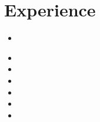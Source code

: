\documentclass[11pt, a4paper]{article}
\begin{document}
\headerSimple

\section*{Experience}
{\scriptsize

  \workplaceFocal
  \begin{itemize}
    \item \experienceBeamMedium
  \end{itemize}

  \workplaceGTRI
  \begin{itemize}
    \item \experienceGTRIGimbalLong
    \item \experienceGTRISoftware
    \item \experienceGTRIEmbeddedLong
    \item \experienceGTRIEdgeMLShort
    \item \experienceGTRIFPGA
    \item \experienceGTRIManagement
  \end{itemize}

  \workplaceClappingDetector

  \workplaceDSPFPGA

  \workplaceConvexMind

  \workplaceSeniorDesign

  \workplaceDDL
  
  \workplaceEmotionSpeech
  \experienceItemsEmotionSpeechLong

  \workplaceMLforT
  
}

\end{document}
